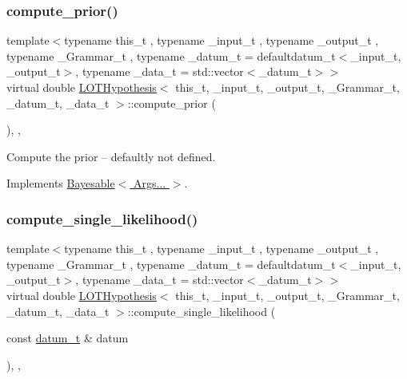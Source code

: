 \subsubsection{\texorpdfstring{compute\+\_\+prior()}{compute\_prior()}}
{\footnotesize\ttfamily template$<$typename this\+\_\+t , typename \+\_\+input\+\_\+t , typename \+\_\+output\+\_\+t , typename \+\_\+\+Grammar\+\_\+t , typename \+\_\+datum\+\_\+t  = defaultdatum\+\_\+t$<$\+\_\+input\+\_\+t, \+\_\+output\+\_\+t$>$, typename \+\_\+data\+\_\+t  = std\+::vector$<$\+\_\+datum\+\_\+t$>$$>$ \\
virtual double \hyperlink{class_l_o_t_hypothesis}{L\+O\+T\+Hypothesis}$<$ this\+\_\+t, \+\_\+input\+\_\+t, \+\_\+output\+\_\+t, \+\_\+\+Grammar\+\_\+t, \+\_\+datum\+\_\+t, \+\_\+data\+\_\+t $>$\+::compute\+\_\+prior (\begin{DoxyParamCaption}{ }\end{DoxyParamCaption})\hspace{0.3cm}{\ttfamily [inline]}, {\ttfamily [override]}, {\ttfamily [virtual]}}



Compute the prior -- defaultly not defined. 



Implements \hyperlink{class_bayesable_a1b057a17212ced123545133e2297c01b}{Bayesable$<$ Args... $>$}.

\mbox{\label{class_l_o_t_hypothesis_aba33afbf945d7eed8c7e07d5a0d31562}} 
\subsubsection{\texorpdfstring{compute\+\_\+single\+\_\+likelihood()}{compute\_single\_likelihood()}}
{\footnotesize\ttfamily template$<$typename this\+\_\+t , typename \+\_\+input\+\_\+t , typename \+\_\+output\+\_\+t , typename \+\_\+\+Grammar\+\_\+t , typename \+\_\+datum\+\_\+t  = defaultdatum\+\_\+t$<$\+\_\+input\+\_\+t, \+\_\+output\+\_\+t$>$, typename \+\_\+data\+\_\+t  = std\+::vector$<$\+\_\+datum\+\_\+t$>$$>$ \\
virtual double \hyperlink{class_l_o_t_hypothesis}{L\+O\+T\+Hypothesis}$<$ this\+\_\+t, \+\_\+input\+\_\+t, \+\_\+output\+\_\+t, \+\_\+\+Grammar\+\_\+t, \+\_\+datum\+\_\+t, \+\_\+data\+\_\+t $>$\+::compute\+\_\+single\+\_\+likelihood (\begin{DoxyParamCaption}\item[{const \hyperlink{class_l_o_t_hypothesis_a3da7a75d135620a3d48a3bfe0be11401}{datum\+\_\+t} \&}]{datum }\end{DoxyParamCaption})\hspace{0.3cm}{\ttfamily [inline]}, {\ttfamily [override]}, {\ttfamily [virtual]}}

